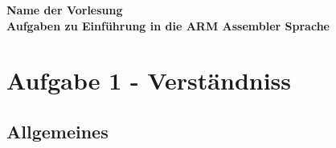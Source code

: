 \documentclass[12pt]{article}
\begin{document}
\begin{center}
  \textbf{\LARGE Name der Vorlesung} \\[1ex]%
  \textbf{\Large Aufgaben zu Einführung in die ARM Assembler Sprache}\\[2ex] %
  
\end{center}

\section{Aufgabe 1 - Verständniss}

\subsection{Allgemeines}
\end{document}
